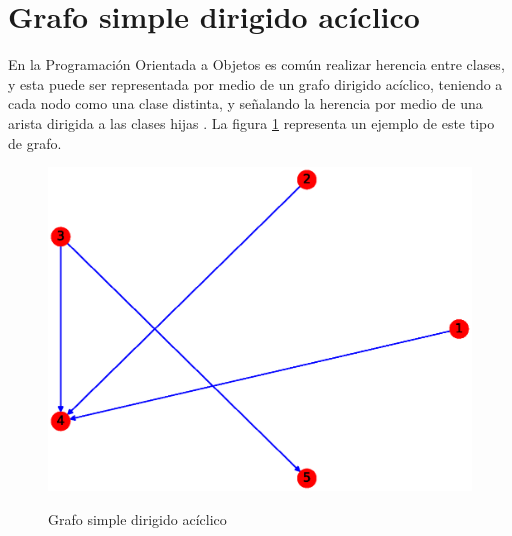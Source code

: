 \documentclass{article}
\begin{document}
\section{Grafo simple dirigido acíclico}
En la Programación Orientada a Objetos es común realizar herencia entre clases, y esta puede ser representada por medio de un grafo dirigido acíclico, teniendo a cada nodo como una clase distinta, y señalando la herencia por medio de una arista dirigida a las clases hijas \cite{GSDA}. La figura \ref{fig:GSDA} representa un ejemplo de este tipo de grafo.
\begin{figure}[h!]
    \caption{Grafo simple dirigido acíclico}
    \includegraphics[width=\textwidth]{4-GSDA}
    \label{fig:GSDA}
\end{figure}



\end{document}
